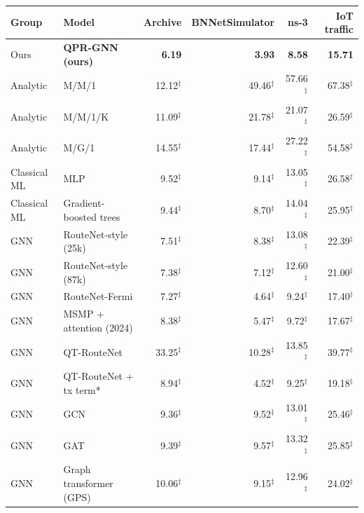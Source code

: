 \begin{tabular}{llrrrr}
\toprule
Group & Model & Archive & BNNetSimulator & ns-3 & IoT traffic \\
\midrule
Ours & \textbf{QPR-GNN (ours)} & \textbf{6.19} & \textbf{3.93} & \textbf{8.58} & \textbf{15.71} \\
Analytic & M/M/1 & 12.12$^\ddagger$ & 49.46$^\ddagger$ & 57.66$^\ddagger$ & 67.38$^\ddagger$ \\
Analytic & M/M/1/K & 11.09$^\ddagger$ & 21.78$^\ddagger$ & 21.07$^\ddagger$ & 26.59$^\ddagger$ \\
Analytic & M/G/1 & 14.55$^\ddagger$ & 17.44$^\ddagger$ & 27.22$^\ddagger$ & 54.58$^\ddagger$ \\
Classical ML & MLP & 9.52$^\ddagger$ & 9.14$^\ddagger$ & 13.05$^\ddagger$ & 26.58$^\ddagger$ \\
Classical ML & Gradient-boosted trees & 9.44$^\ddagger$ & 8.70$^\ddagger$ & 14.04$^\ddagger$ & 25.95$^\ddagger$ \\
GNN & RouteNet-style (25k) & 7.51$^\ddagger$ & 8.38$^\ddagger$ & 13.08$^\ddagger$ & 22.39$^\ddagger$ \\
GNN & RouteNet-style (87k) & 7.38$^\ddagger$ & 7.12$^\ddagger$ & 12.60$^\ddagger$ & 21.00$^\ddagger$ \\
GNN & RouteNet-Fermi & 7.27$^\ddagger$ & 4.64$^\ddagger$ & 9.24$^\ddagger$ & 17.40$^\ddagger$ \\
GNN & MSMP + attention (2024) & 8.38$^\ddagger$ & 5.47$^\ddagger$ & 9.72$^\ddagger$ & 17.67$^\ddagger$ \\
GNN & QT-RouteNet & 33.25$^\ddagger$ & 10.28$^\ddagger$ & 13.85$^\ddagger$ & 39.77$^\ddagger$ \\
GNN & QT-RouteNet + tx term* & 8.94$^\ddagger$ & 4.52$^\ddagger$ & 9.25$^\ddagger$ & 19.18$^\ddagger$ \\
GNN & GCN & 9.36$^\ddagger$ & 9.52$^\ddagger$ & 13.01$^\ddagger$ & 25.46$^\ddagger$ \\
GNN & GAT & 9.39$^\ddagger$ & 9.57$^\ddagger$ & 13.32$^\ddagger$ & 25.85$^\ddagger$ \\
GNN & Graph transformer (GPS) & 10.06$^\ddagger$ & 9.15$^\ddagger$ & 12.96$^\ddagger$ & 24.02$^\ddagger$ \\
\bottomrule
\end{tabular}

